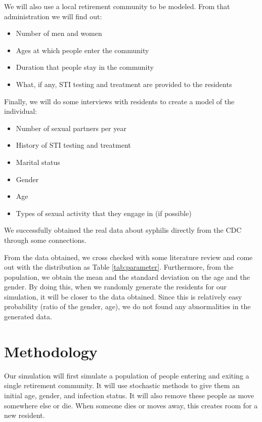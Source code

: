\documentclass{article}
\begin{document}
\begin{normalsize}
   	We will also use a local retirement community to be modeled. From that administration we will find out:
   	\begin{itemize}
    \item Number of men and women 
    \item Ages at which people enter the community
    \item Duration that people stay in the community
    \item What, if any, STI testing and treatment are provided to the residents
   	\end{itemize}     
   	
   	Finally, we will do some interviews with residents to create a model of the individual:
   	\begin{itemize}
    \item Number of sexual partners per year
    \item History of STI testing and treatment 
    \item Marital status
    \item Gender
    \item Age
    \item Types of sexual activity that they engage in (if possible)
   	\end{itemize}     
   	
 We successfully obtained the real data about syphilis directly from the CDC through some connections.
 
 From the data obtained, we cross checked with some literature review and come out with the distribution as Table \ref{tab:parameter}. Furthermore, from the population, we obtain the mean and the standard deviation on the age and the gender. By doing this, when we randomly generate the residents for our simulation, it will be closer to the data obtained. Since this is relatively easy probability (ratio of the gender, age), we do not found any abnormalities in the generated data.
   	
   	\section{Methodology}
   	Our simulation will first simulate a population of people entering and exiting a single retirement community. It will use stochastic methods to give them an initial age, gender, and infection status.  It will also remove these people as move somewhere else or die. When someone dies or moves away, this creates room for a new resident.
   	

\end{normalsize}
\end{document}
